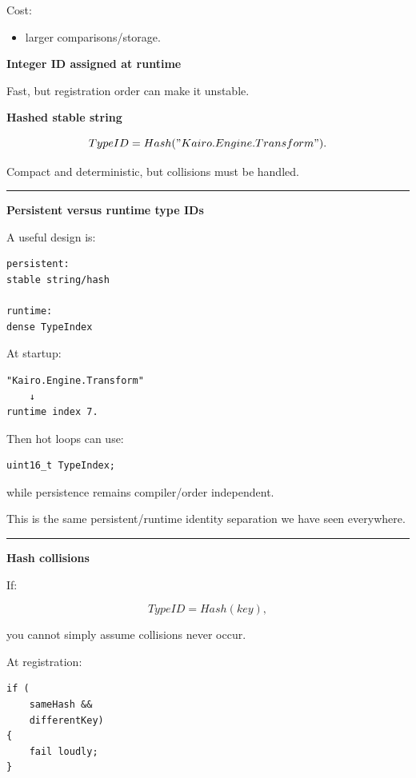 Cost:

\begin{itemize}
\tightlist
\item
  larger comparisons/storage.
\end{itemize}

\textbf{Integer ID assigned at runtime}

Fast, but registration order can make it unstable.

\textbf{Hashed stable string}

\[
TypeID=Hash("Kairo.Engine.Transform").
\]

Compact and deterministic, but collisions must be handled.

\begin{center}\rule{0.5\linewidth}{0.5pt}\end{center}

\textbf{Persistent versus runtime type IDs}

A useful design is:

\begin{verbatim}
persistent:
stable string/hash

runtime:
dense TypeIndex
\end{verbatim}

At startup:

\begin{verbatim}
"Kairo.Engine.Transform"
    ↓
runtime index 7.
\end{verbatim}

Then hot loops can use:

\begin{verbatim}
uint16_t TypeIndex;
\end{verbatim}

while persistence remains compiler/order independent.

This is the same persistent/runtime identity separation we have seen everywhere.

\begin{center}\rule{0.5\linewidth}{0.5pt}\end{center}

\textbf{Hash collisions}

If:

\[
TypeID=Hash(key),
\]

you cannot simply assume collisions never occur.

At registration:

\begin{verbatim}
if (
    sameHash &&
    differentKey)
{
    fail loudly;
}
\end{verbatim}

